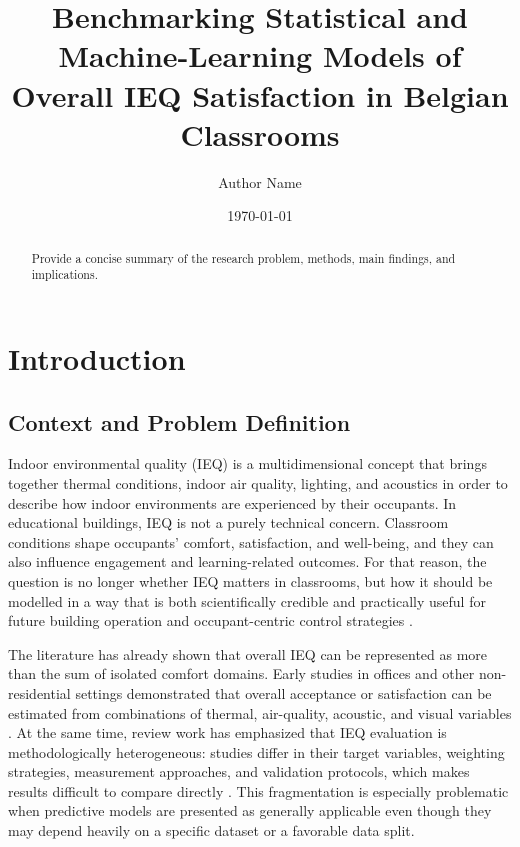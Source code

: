 \documentclass[11pt]{article}
\title{Benchmarking Statistical and Machine-Learning Models of Overall IEQ Satisfaction in Belgian Classrooms}
\author{Author Name}
\date{\today}
\begin{document}
\maketitle

\begin{abstract}
Provide a concise summary of the research problem, methods, main findings, and implications.
\end{abstract}

\section{Introduction}

\subsection{Context and Problem Definition}

Indoor environmental quality (IEQ) is a multidimensional concept that brings together thermal conditions, indoor air quality, lighting, and acoustics in order to describe how indoor environments are experienced by their occupants. In educational buildings, IEQ is not a purely technical concern. Classroom conditions shape occupants' comfort, satisfaction, and well-being, and they can also influence engagement and learning-related outcomes. For that reason, the question is no longer whether IEQ matters in classrooms, but how it should be modelled in a way that is both scientifically credible and practically useful for future building operation and occupant-centric control strategies \cite{heinzerling2013,wong2008,carton2023iaqvec}.

The literature has already shown that overall IEQ can be represented as more than the sum of isolated comfort domains. Early studies in offices and other non-residential settings demonstrated that overall acceptance or satisfaction can be estimated from combinations of thermal, air-quality, acoustic, and visual variables \cite{wong2008,frontczak2012}. At the same time, review work has emphasized that IEQ evaluation is methodologically heterogeneous: studies differ in their target variables, weighting strategies, measurement approaches, and validation protocols, which makes results difficult to compare directly \cite{heinzerling2013}. This fragmentation is especially problematic when predictive models are presented as generally applicable even though they may depend heavily on a specific dataset or a favorable data split.
\end{document}
